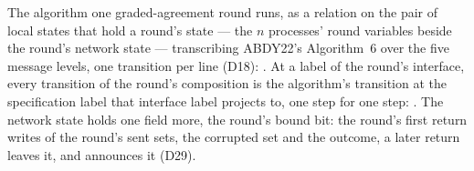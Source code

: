 \begin{definition}
  \label{def:aba-gbca-algorithm-by-abdy}
  \leanok
  The algorithm one graded-agreement round runs, as a relation on the pair of local states that hold a round's state --- the $n$ processes' round variables beside the round's network state --- transcribing ABDY22's Algorithm~6 over the five message levels, one transition per line (D18): .
  At a label of the round's interface, every transition of the round's composition is the algorithm's transition at the specification label that interface label projects to, one step for one step: .
  The network state holds one field more, the round's bound bit: the round's first return writes  of the round's sent sets, the corrupted set and the outcome, a later return leaves it, and  announces it (D29).
\end{definition}
